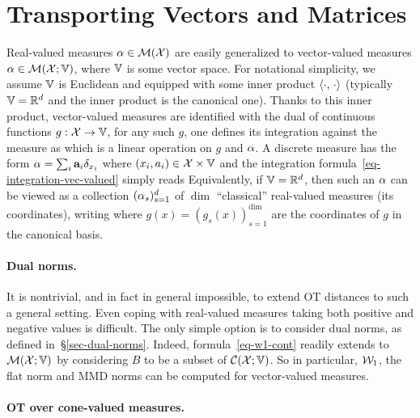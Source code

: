\section{Transporting Vectors and Matrices}

Real-valued measures $\alpha \in \mathcal{M}(\mathcal{X})$ are easily generalized to vector-valued measures $\alpha \in \mathcal{M}(\mathcal{X};\mathbb{V})$, where $\mathbb{V}$ is some vector space. For notational simplicity, we assume $\mathbb{V}$ is Euclidean and equipped with some inner product $\langle \cdot,\,\cdot\rangle$ (typically $\mathbb{V}=\mathbb{R}^d$ and the inner product is the canonical one). Thanks to this inner product, vector-valued measures are identified with the dual of continuous functions $g : \mathcal{X} \rightarrow \mathbb{V}$, \ie for any such $g$, one defines its integration against the measure as 
which is a linear operation on $g$ and $\alpha$. A discrete measure has the form $\alpha = \sum_i \mathrm{\textbf{a}}_i \delta_{x_i}$ where $(x_i,a_i) \in \mathcal{X} \times \mathbb{V}$ and the integration formula~\eqref{eq-integration-vec-valued} simply reads
Equivalently, if $\mathbb{V}=\mathbb{R}^d$, then such an $\alpha$ can be viewed as a collection $(\alpha_s)_{s=1}^d$ of $\dim$ ``classical'' real-valued measures (its coordinates), writing  
where $g(x)=(g_s(x))_{s=1}^\dim$ are the coordinates of $g$ in the canonical basis. 

\paragraph{Dual norms.}

It is nontrivial, and in fact in general impossible, to extend OT distances to such a general setting. Even coping with real-valued measures taking both positive and negative values is difficult. The only simple option is to consider dual norms, as defined in~\S\ref{sec-dual-norms}. Indeed, formula~\eqref{eq-w1-cont} readily extends to $\mathcal{M}(\mathcal{X};\mathbb{V})$ by considering $B$ to be a subset of $\mathcal{C}(\mathcal{X};\mathbb{V})$. So in particular, $\mathcal{W}_1$, the flat norm and MMD norms can be computed for vector-valued measures. 

\paragraph{OT over cone-valued measures. }

